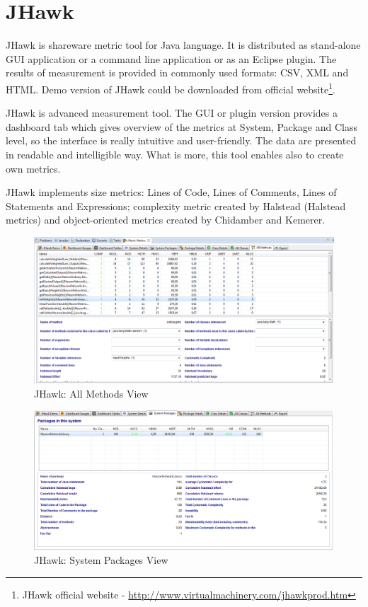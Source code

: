 \section{JHawk}

JHawk is shareware metric tool for Java language. It is distributed as stand-alone GUI application or a command line application or as an Eclipse plugin. The results of measurement is provided in commonly used formats: CSV, XML and HTML. Demo version of JHawk could be downloaded from official website\footnote{JHawk official website - \url{http://www.virtualmachinery.com/jhawkprod.htm}}.

JHawk is advanced measurement tool. The GUI or plugin version provides a dashboard tab which gives overview of the metrics at System, Package and Class level, so the interface is really intuitive and user-friendly. The data are presented in readable and intelligible way. What is more, this tool enables also to create own metrics.

JHawk implements size metrics: Lines of Code, Lines of Comments, Lines of Statements and Expressions; complexity metric created by Halstead (Halstead metrics) and object-oriented metrics created by Chidamber and Kemerer. 

\begin{figure}[h!]
	\centering
	\includegraphics[scale=0.45]{img/jhawk1.png} 
	\caption{JHawk: All Methods View}		
	\label{fig:jhawk1}
\end{figure}

\begin{figure}[h!]
	\centering
	\includegraphics[scale=0.45]{img/jhawk2.png}  
	\caption{JHawk: System Packages View}		
	\label{fig:jhawk2}
\end{figure}

